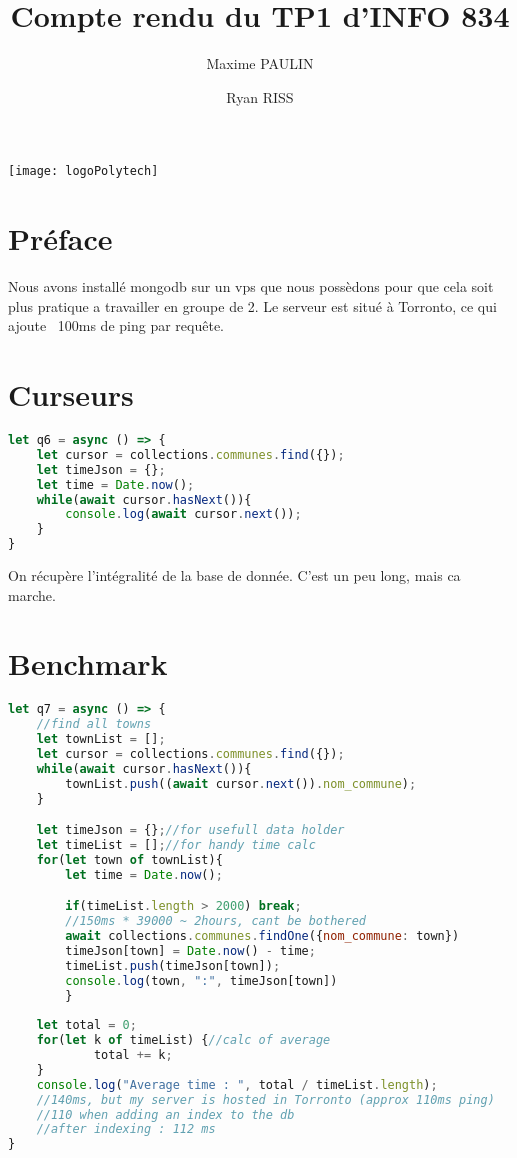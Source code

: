 \documentclass{article}
\title{Compte rendu du TP1 d'INFO 834}
\author{Maxime PAULIN \and Ryan RISS}
\begin{document}
\graphicspath{}
\maketitle
\begin{center}
	\texttt{[image: logoPolytech]}
\end{center}
\newpage

%


\newpage

\section*{Préface}
Nous avons installé mongodb sur un vps que nous possèdons pour que cela soit 
plus pratique a travailler en groupe de 2. Le serveur est situé à Torronto, 
ce qui ajoute ~100ms de ping par requête.
\setcounter{section}{5}
\section{Curseurs}
\begin{lstlisting}[language=javascript]
let q6 = async () => {
	let cursor = collections.communes.find({});
	let timeJson = {};
	let time = Date.now();
	while(await cursor.hasNext()){
		console.log(await cursor.next());
	}
}
\end{lstlisting}
On récupère l'intégralité de la base de donnée. C'est un peu long, mais ca marche.

\section{Benchmark}
\begin{lstlisting}[language=javascript]
let q7 = async () => {
	//find all towns
	let townList = [];
	let cursor = collections.communes.find({});
	while(await cursor.hasNext()){
		townList.push((await cursor.next()).nom_commune);
	}

	let timeJson = {};//for usefull data holder
	let timeList = [];//for handy time calc
	for(let town of townList){
		let time = Date.now();

		if(timeList.length > 2000) break;
		//150ms * 39000 ~ 2hours, cant be bothered
		await collections.communes.findOne({nom_commune: town})
		timeJson[town] = Date.now() - time;
		timeList.push(timeJson[town]);
		console.log(town, ":", timeJson[town])
		}
		
	let total = 0;
	for(let k of timeList) {//calc of average
			total += k;
	}
	console.log("Average time : ", total / timeList.length);
	//140ms, but my server is hosted in Torronto (approx 110ms ping)
	//110 when adding an index to the db
	//after indexing : 112 ms
}
\end{lstlisting}
\end{document}
